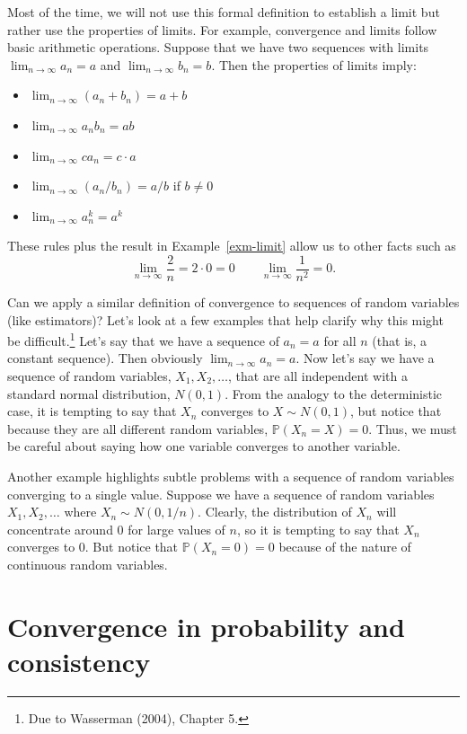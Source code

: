 \documentclass[
  letterpaper,
  DIV=11,
  numbers=noendperiod]{scrreprt}
\providecommand{\tightlist}{%
  \setlength{\itemsep}{0pt}\setlength{\parskip}{0pt}}\usepackage{longtable,booktabs,array}
\renewcommand{\P}{\mathbb{P}}
\theoremstyle{definition}
\theoremstyle{plain}
\theoremstyle{definition}
\theoremstyle{remark}
\begin{document}
Most of the time, we will not use this formal definition to establish a
limit but rather use the properties of limits. For example, convergence
and limits follow basic arithmetic operations. Suppose that we have two
sequences with limits \(\lim_{n\to\infty} a_n = a\) and
\(\lim_{n\to\infty} b_n = b\). Then the properties of limits imply:

\begin{itemize}
\tightlist
\item
  \(\lim_{n\to\infty} (a_n + b_n) = a + b\)
\item
  \(\lim_{n\to\infty} a_nb_n = ab\)
\item
  \(\lim_{n\to\infty} ca_n = c\cdot a\)
\item
  \(\lim_{n\to\infty} (a_n/b_n) = a/b\) if \(b \neq 0\)
\item
  \(\lim_{n\to\infty} a_n^{k} = a^{k}\)
\end{itemize}

These rules plus the result in Example~\ref{exm-limit} allow us to other
facts such as \[
\lim_{n\to\infty} \frac{2}{n} = 2 \cdot 0 = 0 \qquad  \lim_{n\to\infty} \frac{1}{n^{2}} = 0.
\]

Can we apply a similar definition of convergence to sequences of random
variables (like estimators)? Let's look at a few examples that help
clarify why this might be difficult.\footnote{Due to Wasserman (2004),
  Chapter 5.} Let's say that we have a sequence of \(a_n = a\) for all
\(n\) (that is, a constant sequence). Then obviously
\(\lim_{n\rightarrow\infty} a_n = a\). Now let's say we have a sequence
of random variables, \(X_1, X_2, \ldots\), that are all independent with
a standard normal distribution, \(N(0,1)\). From the analogy to the
deterministic case, it is tempting to say that \(X_n\) converges to
\(X \sim N(0, 1)\), but notice that because they are all different
random variables, \(\P(X_n = X) = 0\). Thus, we must be careful about
saying how one variable converges to another variable.

Another example highlights subtle problems with a sequence of random
variables converging to a single value. Suppose we have a sequence of
random variables \(X_1, X_2, \ldots\) where \(X_n \sim N(0, 1/n)\).
Clearly, the distribution of \(X_n\) will concentrate around 0 for large
values of \(n\), so it is tempting to say that \(X_n\) converges to 0.
But notice that \(\P(X_n = 0) = 0\) because of the nature of continuous
random variables.

\hypertarget{convergence-in-probability-and-consistency}{%
\section{Convergence in probability and
consistency}\label{convergence-in-probability-and-consistency}}
\end{document}
